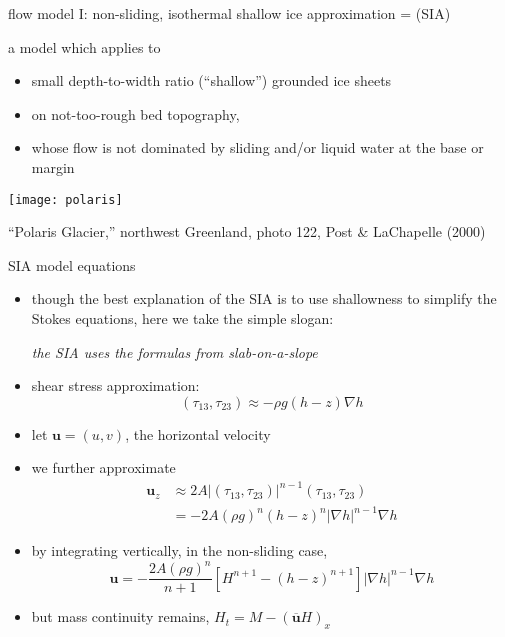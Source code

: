 \begin{frame}{flow model I: non-sliding, isothermal shallow ice approximation = (SIA)}

a model which applies to
\begin{itemize}
\item small depth-to-width ratio (``shallow'') grounded ice sheets
\item on not-too-rough bed topography,
\item whose flow is not dominated by sliding and/or liquid water at the base or margin
\end{itemize}

\begin{center}
  \texttt{[image: polaris]}

\tiny ``Polaris Glacier,'' northwest Greenland, photo 122, Post \& LaChapelle (2000)\nocite{PostLaChapelle}
\end{center}

\end{frame}


\begin{frame}{SIA model equations}

\begin{itemize}
\item \small though the best explanation of the SIA is to use shallowness to simplify the Stokes equations, here we take the simple slogan:\normalsize

\begin{center}
\emph{the SIA uses the formulas from slab-on-a-slope}
\end{center}
\item shear stress approximation:
	$$(\tau_{13},\tau_{23}) \approx - \rho g (h-z) \nabla h$$
\item let $\mathbf{u} = (u,v)$, the horizontal velocity
\item we further approximate
\begin{align*}
\mathbf{u}_z &\approx 2 A |(\tau_{13},\tau_{23})|^{n-1} (\tau_{13},\tau_{23}) \\
     &= - 2 A (\rho g)^n (h-z)^n |\nabla h|^{n-1} \nabla h
\end{align*}
\item by integrating vertically, in the non-sliding case,
    $$\mathbf{u} = - \frac{2 A (\rho g)^n}{n+1} \left[H^{n+1} - (h-z)^{n+1}\right] |\nabla h|^{n-1} \nabla h$$
\item but mass continuity remains, $H_t = M - \left(\overline{\mathbf{u}} H\right)_x$
\end{itemize}
\end{frame}


